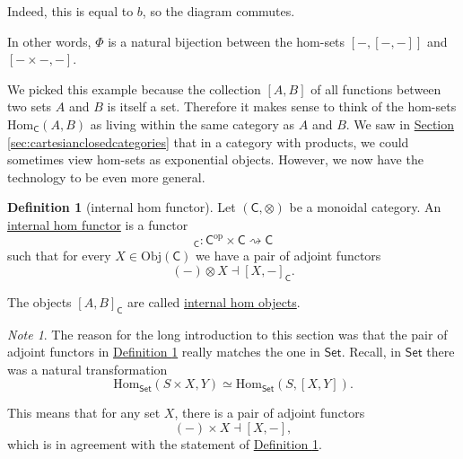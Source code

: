 \documentclass[a4paper,10pt]{scrreprt}
\newcommand{\defn}[1]{\ul{#1}}
\newcommand{\Obj}{\mathrm{Obj}}
\newcommand{\Hom}{\mathrm{Hom}}
\theoremstyle{definition}
\newtheorem{definition}{Definition}[section]
\theoremstyle{plain}
\theoremstyle{remark}
\newtheorem{note}{Note}[section]
\begin{document}
Indeed, this is equal to $b$, so the diagram commutes.

In other words, $\Phi$ is a natural bijection between the hom-sets $[-,[-,-]]$ and $[- \times -, -]$.

We picked this example because the collection $[A, B]$ of all functions between two sets $A$ and $B$ is itself a set. Therefore it makes sense to think of the hom-sets $\Hom_{\mathsf{C}}(A, B)$ as living within the same category as $A$ and $B$. We saw in \hyperref[sec:cartesianclosedcategories]{Section \ref*{sec:cartesianclosedcategories}} that in a category with products, we could sometimes view hom-sets as exponential objects. However, we now have the technology to be even more general.

\begin{definition}[internal hom functor]
  \label{def:internalhomfunctor}
  Let $(\mathsf{C}, \otimes)$ be a monoidal category. An \defn{internal hom functor} is a functor
  \begin{equation*}
    [-, -]_{\mathsf{C}}\colon \mathsf{C}^{\mathrm{op}} \times \mathsf{C} \rightsquigarrow \mathsf{C}
  \end{equation*}
  such that for every $X \in \Obj(\mathsf{C})$ we have a pair of adjoint functors
  \begin{equation*}
    (-) \otimes X \dashv [X, -]_{\mathsf{C}}.
  \end{equation*}

  The objects $[A, B]_{\mathsf{C}}$ are called \defn{internal hom objects}.
\end{definition}

\begin{note}
  The reason for the long introduction to this section was that the pair of adjoint functors in \hyperref[def:internalhomfunctor]{Definition \ref*{def:internalhomfunctor}} really matches the one in $\mathsf{Set}$. Recall, in $\mathsf{Set}$ there was a natural transformation
  \begin{equation*}
    \Hom_{\mathsf{Set}}(S \times X, Y) \simeq \Hom_{\mathsf{Set}}(S, [X, Y]).
  \end{equation*}

  This means that for any set $X$, there is a pair of adjoint functors 
  \begin{equation*}
    (-) \times X \dashv [X, -],
  \end{equation*}
  which is in agreement with the statement of \hyperref[def:internalhomfunctor]{Definition \ref*{def:internalhomfunctor}}.
\end{note}
\end{document}
